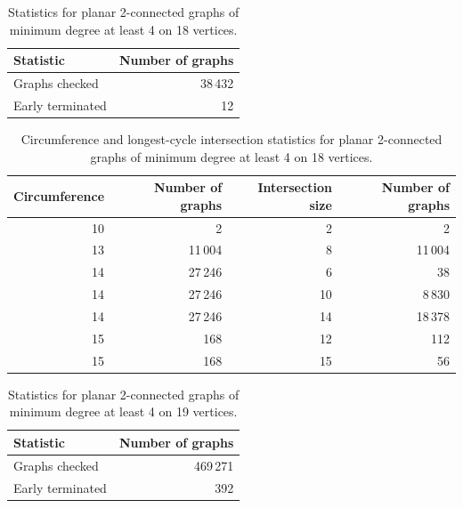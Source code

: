 \begin{table}[ht]
\centering
\caption{Statistics for planar 2-connected graphs of minimum degree at least 4 on 18 vertices.}
\label{tab:summary-min4-n18}
\begin{tabular}{lr}
\toprule
Statistic & Number of graphs \\
\midrule
Graphs checked & 38\,432 \\
Early terminated & 12 \\
\bottomrule
\end{tabular}
\end{table}


\begin{table}[ht]
\centering
\caption{Circumference and longest-cycle intersection statistics for planar 2-connected graphs of minimum degree at least 4 on 18 vertices.}
\label{tab:circ-intersection-min4-n18}
\begin{tabular}{rrrr}
\toprule
Circumference & Number of graphs & Intersection size & Number of graphs \\
\midrule
10 & 2 & 2 & 2 \\
13 & 11\,004 & 8 & 11\,004 \\
14 & 27\,246 & 6 & 38 \\
14 & 27\,246 & 10 & 8\,830 \\
14 & 27\,246 & 14 & 18\,378 \\
15 & 168 & 12 & 112 \\
15 & 168 & 15 & 56 \\
\bottomrule
\end{tabular}
\end{table}

\begin{table}[ht]
\centering
\caption{Statistics for planar 2-connected graphs of minimum degree at least 4 on 19 vertices.}
\label{tab:summary-min4-n19}
\begin{tabular}{lr}
\toprule
Statistic & Number of graphs \\
\midrule
Graphs checked & 469\,271 \\
Early terminated & 392 \\
\bottomrule
\end{tabular}
\end{table}


